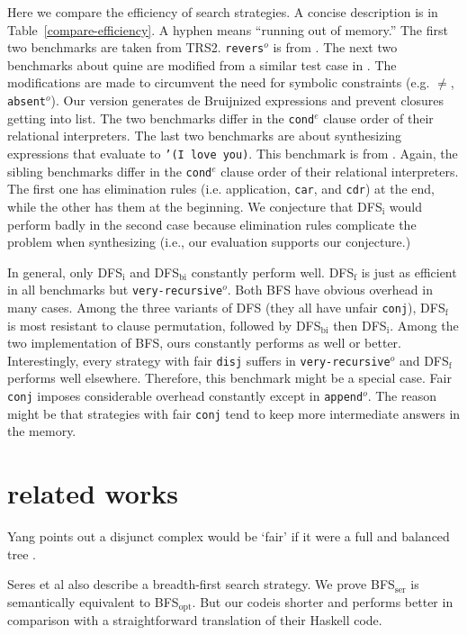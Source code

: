 \documentclass[format=acmlarge, review=true, authordraft=true]{acmart}
\newcommand{\conde}{\texttt{cond$^e$}}
\newcommand{\conj}{\texttt{conj}}
\newcommand{\disj}{\texttt{disj}}
\newcommand{\BFSopt}[0]{BFS$_\textrm{opt}$}
\newcommand{\BFSser}[0]{BFS$_\textrm{ser}$}
\newcommand{\veryrecursiveo}[0]{\texttt{very-recursive$^o$}}
\newcommand{\appendo}[0]{\texttt{append$^o$}}
\newcommand{\reverso}[0]{\texttt{revers$^o$}}
\begin{document}
Here we compare the efficiency of search strategies. A concise 
description is in Table~\ref{compare-efficiency}. A hyphen means ``running out of 
memory.'' The first two benchmarks are taken from 
TRS2. \reverso{} is from 
\citet{rozplokhas2018improving}. The next two benchmarks 
about quine are modified from a similar test case in \citet{byrd2017unified}. 
The modifications are made 
to circumvent the need for symbolic constraints (e.g. $\neq$, 
\texttt{absent$^o$}). Our version generates de 
Bruijnized expressions and prevent closures getting into list. The two 
benchmarks differ in the \conde{} clause order of their relational 
interpreters. 
The last two 
benchmarks are about synthesizing expressions that evaluate to \texttt{'(I love 
you)}. This benchmark is from \citet{byrd2017unified}. Again, the 
sibling benchmarks differ in the \conde{} clause order of their relational 
interpreters. The first one 
has elimination rules (i.e. application, \texttt{car}, and \texttt{cdr}) at the 
end, while the other has them at the beginning. We conjecture that DFS$_\textrm{i}$ would 
perform badly in the second case because elimination rules complicate the 
problem when synthesizing (i.e., our evaluation supports our conjecture.)

In general, only DFS$_\textrm{i}$ and DFS$_\textrm{bi}$ constantly perform well. DFS$_\textrm{f}$ is just as 
efficient in all benchmarks but \veryrecursiveo{}. Both BFS have obvious 
overhead in many cases. Among the three variants of DFS (they all have unfair 
\conj{}), DFS$_\textrm{f}$ is most resistant to clause permutation, followed by DFS$_\textrm{bi}$ then 
DFS$_\textrm{i}$. Among the two implementation of BFS, ours constantly performs as well or 
better. Interestingly, every strategy with fair \disj{} suffers in 
\veryrecursiveo{} and DFS$_\textrm{f}$ performs well elsewhere. 
Therefore, this 
benchmark might be a special case. Fair \conj{} imposes considerable overhead 
constantly except in \appendo{}. The reason might be that strategies with 
fair \conj{} tend to keep more intermediate answers in the memory.

\section{related works}

Yang \citet{yang2010adventures} points out a disjunct complex would be `fair' 
if it were a full and balanced tree .

Seres et al \citet{seres1999algebra} also describe a breadth-first search 
strategy. We prove \BFSser{} is semantically equivalent to \BFSopt. But our codeis shorter and performs better in comparison with a straightforward 
translation of their Haskell code.
\end{document}
